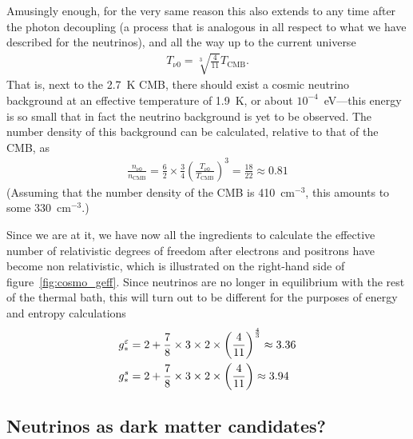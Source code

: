 Amusingly enough, for the very same reason this also extends to any time after the
photon decoupling (a process that is analogous in all respect to what we have described
for the neutrinos), and all the way up to the current universe
\begin{align*}
  T_{\nu 0} = \sqrt[3]{\frac{4}{11}} T_\text{CMB}.
\end{align*}
That is, next to the 2.7~K CMB, there should exist a cosmic neutrino background at
an effective temperature of 1.9~K, or about $10^{-4}$~eV---this energy is so small
that in fact the neutrino background is yet to be observed. The number density of
this background can be calculated, relative to that of the CMB, as
\begin{align*}
  \frac{n_{\nu 0}}{n_\text{CMB}} =
  \frac{6}{2} \times \frac{3}{4} \left( \frac{T_{\nu 0}}{T_\text{CMB}} \right)^3 =
  \frac{18}{22} \approx 0.81
\end{align*}
(Assuming that the number density of the CMB is 410~cm$^{-3}$, this amounts to
some 330~cm$^{-3}$.)

Since we are at it, we have now all the ingredients to calculate the effective
number of relativistic degrees of freedom after electrons and positrons have become
non relativistic, which is illustrated on the right-hand side of figure~\ref{fig:cosmo_geff}.
Since neutrinos are no longer in equilibrium with the rest of the thermal bath, this
will turn out to be different for the purposes of energy and entropy
calculations
\begin{align*}
  g_*^\varepsilon & =
  2 + \frac{7}{8} \times 3 \times 2 \times \left( \frac{4}{11} \right)^{\frac{4}{3}}
  \approx 3.36 \\
  g_*^s & =
  2 + \frac{7}{8} \times 3 \times 2 \times \left( \frac{4}{11} \right)
  \approx 3.94
\end{align*}



\subsection{Neutrinos as dark matter candidates?}

